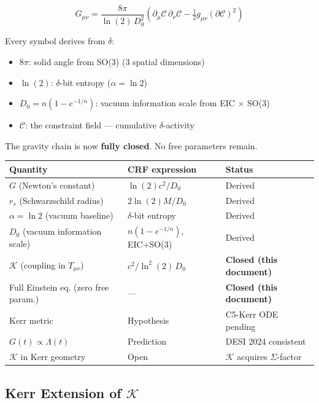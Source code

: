 \documentclass[12pt, a4paper]{article}
\begin{document}
\begin{keybox}[title={Full CRF Einstein Equations: Zero Free Parameters}]
\[
  \boxed{G_{\mu\nu} = \frac{8\pi}{\ln(2)\,D_0^2}\!\left(
    \partial_\mu\mathcal{C}\,\partial_\nu\mathcal{C}
    - \tfrac{1}{2}g_{\mu\nu}(\partial\mathcal{C})^2\right)}
\]

Every symbol derives from $\delta$:
\begin{itemize}
\item $8\pi$: solid angle from SO(3) (3 spatial dimensions)
\item $\ln(2)$: $\delta$-bit entropy ($\alpha = \ln 2$)
\item $D_0 = n(1-e^{-1/n})$: vacuum information scale from EIC $\times$ SO(3)
\item $\mathcal{C}$: the constraint field --- cumulative $\delta$-activity
\end{itemize}

The gravity chain is now \textbf{fully closed}. No free parameters remain.

\begin{center}
\renewcommand{\arraystretch}{1.2}
\begin{tabular}{p{5cm} p{2.5cm} p{3.5cm}}
\toprule
\textbf{Quantity} & \textbf{CRF expression} & \textbf{Status} \\
\midrule
$G$ (Newton's constant) & $\ln(2)c^2/D_0$ & Derived \\
$r_s$ (Schwarzschild radius) & $2\ln(2)M/D_0$ & Derived \\
$\alpha = \ln 2$ (vacuum baseline) & $\delta$-bit entropy & Derived \\
$D_0$ (vacuum information scale) & $n(1-e^{-1/n})$, EIC+SO(3) & Derived \\
$\mathcal{K}$ (coupling in $T_{\mu\nu}$) & $c^2/\ln^2(2)\,D_0$ & \textbf{Closed (this document)} \\
Full Einstein eq. (zero free param.) & --- & \textbf{Closed (this document)} \\
Kerr metric & Hypothesis & C5-Kerr ODE pending \\
$G(t)\propto\Lambda(t)$ & Prediction & DESI 2024 consistent \\
$\mathcal{K}$ in Kerr geometry & Open & $\mathcal{K}$ acquires $\Sigma$-factor \\
\bottomrule
\end{tabular}
\end{center}
\end{keybox}

\subsection{Kerr Extension of $\mathcal{K}$}
\end{document}
